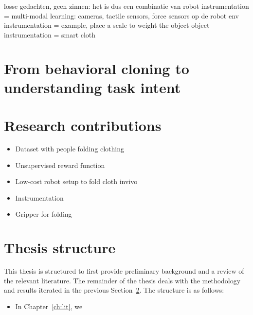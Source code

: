 \documentclass[\home/main.tex]{subfiles}
\begin{document}
losse gedachten, geen zinnen:
    het is dus een combinatie van 
        robot instrumentation = multi-modal learning: cameras, tactile sensors, force sensors op de robot 
        env instrumentation = example, place a scale to weight the object 
        object instrumentation = smart cloth 

\section{From behavioral cloning to understanding task intent}
\section{Research contributions} \label{sec:intro_contributions}
\begin{itemize}
    \item Dataset with people folding clothing
    \item Unsupervised reward function
    \item Low-cost robot setup to fold cloth invivo
    \item Instrumentation
    \item Gripper for folding
\end{itemize}

\section{Thesis structure}
This thesis is structured to first provide preliminary background and a review of the relevant literature. The remainder of the thesis deals with the methodology and results iterated in the previous Section~\ref{sec:intro_contributions}. The structure is as follows:
\begin{itemize}
    \item In Chapter~\ref{ch:lit}, we
\end{itemize}
\end{document}
